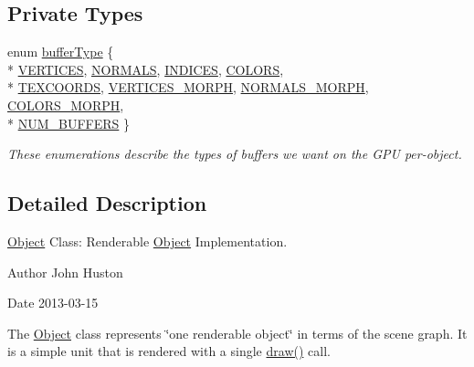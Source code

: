 \subsection*{Private Types}
\begin{DoxyCompactItemize}
\item 
enum \hyperlink{class_object_a74a39247838865244defd0ae9712df9b}{buffer\-Type} \{ \\*
\hyperlink{class_object_a74a39247838865244defd0ae9712df9ba23be05de1d4a9e5738eff4c1860f8bfd}{V\-E\-R\-T\-I\-C\-E\-S}, 
\hyperlink{class_object_a74a39247838865244defd0ae9712df9bac91e7a2ef76150b999a9af53d229a8e0}{N\-O\-R\-M\-A\-L\-S}, 
\hyperlink{class_object_a74a39247838865244defd0ae9712df9babe6f0cf968db450f99d8e176c4d23091}{I\-N\-D\-I\-C\-E\-S}, 
\hyperlink{class_object_a74a39247838865244defd0ae9712df9ba69fb14c98b43d636b30ef5e77b492968}{C\-O\-L\-O\-R\-S}, 
\\*
\hyperlink{class_object_a74a39247838865244defd0ae9712df9badc601b2ac4ff7f3e455faa35208e431f}{T\-E\-X\-C\-O\-O\-R\-D\-S}, 
\hyperlink{class_object_a74a39247838865244defd0ae9712df9ba0e9e165431001465775bc5ba2b8d1bd8}{V\-E\-R\-T\-I\-C\-E\-S\-\_\-\-M\-O\-R\-P\-H}, 
\hyperlink{class_object_a74a39247838865244defd0ae9712df9baa2afe042e85c0772ba75ba0ee6223a57}{N\-O\-R\-M\-A\-L\-S\-\_\-\-M\-O\-R\-P\-H}, 
\hyperlink{class_object_a74a39247838865244defd0ae9712df9ba814c8171ad45f6e954ffb474a5dfacb1}{C\-O\-L\-O\-R\-S\-\_\-\-M\-O\-R\-P\-H}, 
\\*
\hyperlink{class_object_a74a39247838865244defd0ae9712df9ba1999a38dc687c7ae05c884078de39b51}{N\-U\-M\-\_\-\-B\-U\-F\-F\-E\-R\-S}
 \}
\begin{DoxyCompactList}\small\item\em These enumerations describe the types of buffers we want on the G\-P\-U per-\/object. \end{DoxyCompactList}\end{DoxyCompactItemize}


\subsection{Detailed Description}
\hyperlink{class_object}{Object} Class\-: Renderable \hyperlink{class_object}{Object} Implementation. 

\begin{DoxyAuthor}{Author}
John Huston 
\end{DoxyAuthor}
\begin{DoxyDate}{Date}
2013-\/03-\/15
\end{DoxyDate}
The \hyperlink{class_object}{Object} class represents \char`\"{}one renderable object\char`\"{} in terms of the scene graph. It is a simple unit that is rendered with a single \hyperlink{class_object_a53e2ee7f548550be014126bed139fe69}{draw()} call.

